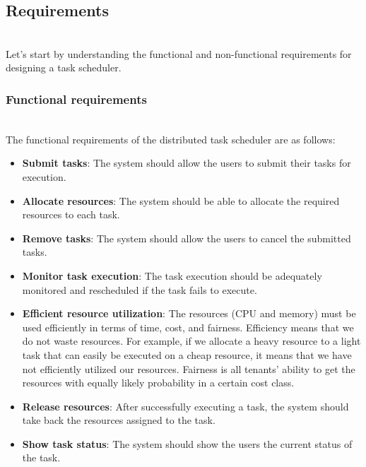 

\subsection{Requirements}\label{m1N3FSFplPMTcV652JVYA}
\\
Let's start by understanding the functional and non-functional requirements for designing a task scheduler.

\subsubsection{Functional requirements}\label{iuloVafL_M0rGS46gEtbD}
\\
The functional requirements of the distributed task scheduler are as follows:

\begin{itemize}
\item
\protect{}\label{37WZqJRFzjCOWNUOIOND0}
\textbf{Submit tasks}: The system should allow the users to submit their tasks for execution.
\item
\protect{}\label{BQPjfXA0ZH0dfjoYkKWd7}
\textbf{Allocate resources}: The system should be able to allocate the required resources to each task.
\item
\protect{}\label{2mzUe7lqXfdoG_3ii9LGE}
\textbf{Remove tasks}: The system should allow the users to cancel the submitted tasks.
\item
\protect{}\label{sggGB0AEhebFqIqHLrcZb}
\textbf{Monitor task execution}: The task execution should be adequately monitored and rescheduled if the task fails to execute.
\item
\protect{}\label{JjuAGqUsJe11nqHgZtbmn}
\textbf{Efficient resource utilization}: The resources (CPU and memory) must be used efficiently in terms of time, cost, and fairness. Efficiency means that we do not waste resources. For example, if we allocate a heavy resource to a light task that can easily be executed on a cheap resource, it means that we have not efficiently utilized our resources. Fairness is all tenants' ability to get the resources with equally likely probability in a certain cost class.
\item
\protect{}\label{p7xKmA9B0Hw1z9RCZu2Bg}
\textbf{Release resources}: After successfully executing a task, the system should take back the resources assigned to the task.
\item
\protect{}\label{aTRx6ihbHU5pnOOZVnkzE}
\textbf{Show task status}: The system should show the users the current status of the task.
\end{itemize}

